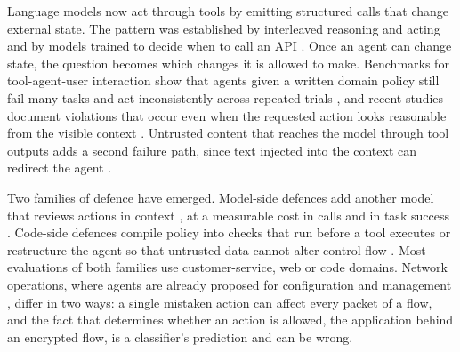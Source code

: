 \documentclass[conference,a4paper]{IEEEtran}
\begin{document}
Language models now act through tools by emitting structured calls that change external state. The pattern was established by interleaved reasoning and acting \cite{yao2023react} and by models trained to decide when to call an API \cite{schick2023toolformer}. Once an agent can change state, the question becomes which changes it is allowed to make. Benchmarks for tool-agent-user interaction show that agents given a written domain policy still fail many tasks and act inconsistently across repeated trials \cite{yao2025taubench}, and recent studies document violations that occur even when the requested action looks reasonable from the visible context \cite{wu2026policyinvisible}. Untrusted content that reaches the model through tool outputs adds a second failure path, since text injected into the context can redirect the agent \cite{greshake2023,debenedetti2024agentdojo}.

Two families of defence have emerged. Model-side defences add another model that reviews actions in context \cite{kang2026policyguard,chen2025shieldagent}, at a measurable cost in calls and in task success \cite{sah2026verifier}. Code-side defences compile policy into checks that run before a tool executes \cite{zwerdling2025,wang2026agentspec} or restructure the agent so that untrusted data cannot alter control flow \cite{debenedetti2025camel}. Most evaluations of both families use customer-service, web or code domains. Network operations, where agents are already proposed for configuration and management \cite{wang2024netconfeval,wang2025confucius,adanza2026}, differ in two ways: a single mistaken action can affect every packet of a flow, and the fact that determines whether an action is allowed, the application behind an encrypted flow, is a classifier's prediction and can be wrong.
\end{document}
